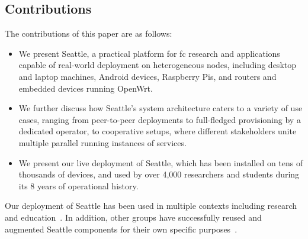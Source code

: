 \subsection{Contributions}

The contributions of this paper are as follows:
\begin{itemize}
\item We present Seattle, a practical platform for \gls{fc} research
and applications
capable of real-world deployment on heterogeneous nodes,
including desktop and laptop machines, Android devices,
Raspberry Pis,
and routers and embedded devices running OpenWrt.
\item We further discuss how
Seattle's system architecture caters to a variety of use cases,
ranging from peer-to-peer deployments to full-fledged
provisioning by a dedicated operator, to cooperative setups,
where different stakeholders unite multiple parallel running
instances of services.
\item We present our live deployment of Seattle, which has been
installed on tens of thousands of devices, and used by over 4,000
researchers and students during its 8 years of operational history.
\end{itemize}
Our deployment of Seattle has been used in multiple contexts
including research~\cite{li2015fence,rafetseder2013sensorium,zhuang2014sensibility,Eisl1010:Service,Tuts1010:Sustained,collares2011smart,zhuang2015privacy,cappos2014blursense,7133607} and education~\cite{Wallace_CCSC_2011,Cappos_CCSCCP_2010,Cappos_CCSCNW_2009,Cappos_SIGCSE_2014,Hooshangi_SIGCSE_2015}.
In addition, other groups have successfully reused and augmented Seattle components
for their own specific purposes~\cite{chard2010social,chard12ssc,caton2014social,muller2014tomato,tomato,eittenberger2012doubtless,zhuang2012distributed,zhuang2014taking,tredger2013building}.
